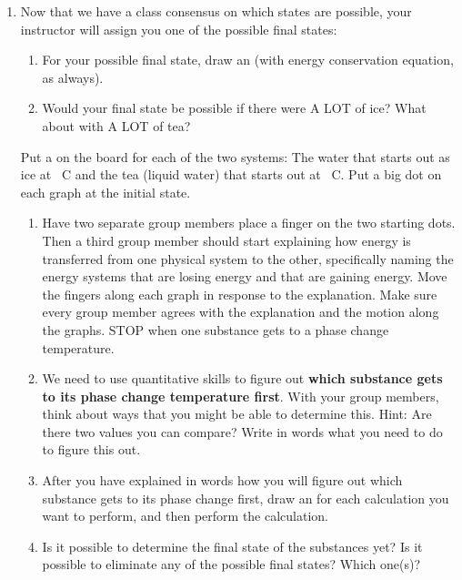 \begin{enumerate}
\WCD

	\item Now that we have a class consensus on which states are possible, your instructor will assign you one of the possible final states:
	\begin{enumerate}
		\item For your possible final state, draw an \EnergyDiagram{} (with energy conservation equation, as always).
		\item Would your final state be possible if there were A LOT of ice?  What about with A LOT of tea?

\WCD

	\end{enumerate}

	
	Put a \TempGraph{} on the board for each of the two systems: The water that starts out as ice at \unit[-65]{\textdegree C} and the tea (liquid water) that starts out at \unit[20]{\textdegree C}. Put a big dot on each graph at the initial state.
	
	\begin{enumerate}
		\item Have two separate group members place a finger on the two starting dots. Then a third group member should start explaining how energy is transferred from one physical system to the other, specifically naming the energy systems that are losing energy and that are gaining energy. Move the fingers along each graph in response to the explanation. Make sure every group member agrees with the explanation and the motion along the graphs. STOP when one substance gets to a phase change temperature.
		
		\item We need to use quantitative skills to figure out \textbf{which substance gets to its phase change temperature first}. With your group members, think about ways that you might be able to determine this. Hint: Are there two values you can compare? Write in words what you need to do to figure this out.
		\label{act123-compare-energies}
		
		\item After you have explained in words how you will figure out which substance gets to its phase change first, draw an \EnergyDiagram for each calculation you want to perform, and then perform the calculation.

\WCD 

		\item Is it possible to determine the final state of the substances yet?  Is it possible to eliminate any of the possible final states? Which one(s)?
		

\end{enumerate}
\end{enumerate}
